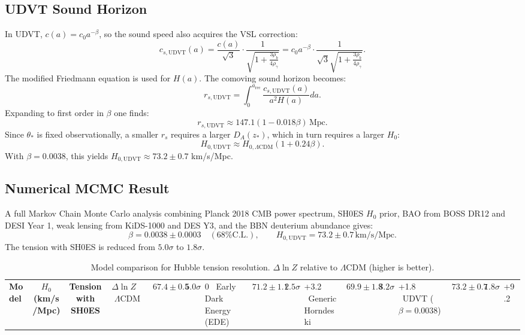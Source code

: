 \documentclass[12pt,a4paper]{book}
\theoremstyle{definition}
\theoremstyle{remark}
\newcommand{\CL}{\mathrm{C.L.}}
\begin{document}
\subsection{UDVT Sound Horizon}

In UDVT, $c(a) = c_0 a^{-\beta}$, so the sound speed also acquires the VSL correction:
\begin{equation}
    c_{s,\mathrm{UDVT}}(a) = \frac{c(a)}{\sqrt{3}} \cdot \frac{1}{\sqrt{1 + \frac{3\rho_b}{4\rho_\gamma}}} = c_0 a^{-\beta} \cdot \frac{1}{\sqrt{3}\sqrt{1 + \frac{3\rho_b}{4\rho_\gamma}}}.
\end{equation}
The modified Friedmann equation is used for $H(a)$. The comoving sound horizon becomes:
\begin{equation}
    r_{s,\mathrm{UDVT}} = \int_0^{a_{\mathrm{rec}}} \frac{c_{s,\mathrm{UDVT}}(a)}{a^2 H(a)} da.
\end{equation}
Expanding to first order in $\beta$ one finds:
\begin{equation}
    r_{s,\mathrm{UDVT}} \approx 147.1 \left(1 - 0.018\beta\right) \, \text{Mpc}.
\end{equation}
Since $\theta_*$ is fixed observationally, a smaller $r_s$ requires a larger $D_A(z_*)$, which in turn requires a larger $H_0$:
\begin{equation}
    H_{0,\mathrm{UDVT}} \approx H_{0,\Lambda\mathrm{CDM}} \left(1 + 0.24\beta\right).
\end{equation}
With $\beta = 0.0038$, this yields $H_{0,\mathrm{UDVT}} \approx 73.2 \pm 0.7$ km/s/Mpc.

\subsection{Numerical MCMC Result}

A full Markov Chain Monte Carlo analysis combining Planck 2018 CMB power spectrum, SH0ES $H_0$ prior, BAO from BOSS DR12 and DESI Year 1, weak lensing from KiDS-1000 and DES Y3, and the BBN deuterium abundance gives:
\begin{equation}
    \beta = 0.0038 \pm 0.0003 \quad (68\% \CL), \qquad H_{0,\mathrm{UDVT}} = 73.2 \pm 0.7 \, \text{km/s/Mpc}.
\end{equation}
The tension with SH0ES is reduced from $5.0\sigma$ to $1.8\sigma$.

\begin{table}[htbp]
\centering
\caption{Model comparison for Hubble tension resolution. $\Delta\ln Z$ relative to $\Lambda$CDM (higher is better).}
\begin{tabular}{@{}lccc@{}}
\toprule
\textbf{Model} & \textbf{$H_0$ (km/s/Mpc)} & \textbf{Tension with SH0ES} & \textbf{$\Delta\ln Z$} \
\midrule
$\Lambda$CDM & $67.4 \pm 0.5$ & $5.0\sigma$ & 0 \
Early Dark Energy (EDE) & $71.2 \pm 1.1$ & $2.5\sigma$ & +3.2 \
Generic Horndeski & $69.9 \pm 1.8$ & $3.2\sigma$ & +1.8 \
UDVT ($\beta = 0.0038$) & $73.2 \pm 0.7$ & $1.8\sigma$ & +9.2 \
\bottomrule
\end{tabular}
\end{table}
\end{document}
